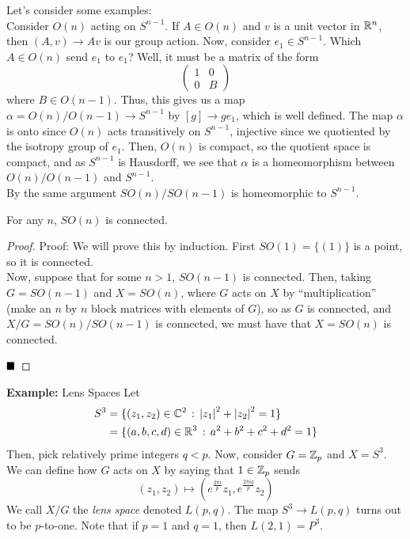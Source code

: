
Let's consider some examples:\\

Consider $O(n)$ acting on $S^{n - 1}$. If $A \in O(n)$ and $v$ is a unit vector in $\mathbb{R}^n$, then $(A, v) \to Av$ is our group action. Now, consider $e_1 \in S^{n - 1}$. Which $A \in O(n)$ send $e_1$ to $e_1$? Well, it must be a matrix of the form
\[ \begin{pmatrix} 1 & 0 \\ 0 & B \end{pmatrix} \]
where $B \in O(n  - 1)$. Thus, this gives us a map $\alpha = O(n) / O(n - 1) \to S^{n - 1}$ by $[g] \to ge_1$, which is well defined. The map $\alpha$ is onto since $O(n)$ acts transitively on $S^{n - 1}$, injective since we quotiented by the isotropy group of $e_1$. Then, $O(n)$ is compact, so the quotient space is compact, and as $S^{n - 1}$ is Hausdorff, we see that $\alpha$ is a homeomorphism between $O(n)/O(n - 1)$ and $S^{n - 1}$.\\

By the same argument $SO(n)/SO(n - 1)$ is homeomorphic to $S^{n - 1}$.

\begin{lemma}
    For any $n$, $SO(n)$ is connected.
\end{lemma}
\begin{proof}{Proof:}
    We will prove this by induction. First $SO(1) = \{(1)\}$ is a point, so it is connected.\\

    Now, suppose that for some $n > 1$, $SO(n - 1)$ is connected. Then, taking $G = SO(n - 1)$ and $X = SO(n)$, where $G$ acts on $X$ by ``multiplication'' (make an $n$ by $n$ block matrices with elements of $G$), so as $G$ is connected, and $X/G = SO(n)/SO(n - 1)$ is connected, we must have that $X = SO(n)$ is connected. 

    $\qed$
\end{proof}

\begin{example}{\textbf{Example:} Lens Spaces}
    Let
    \begin{align*}
        S^3 &= \{(z_1, z_2) \in \mathbb{C}^2 \, :\, \left\lvert {z_1} \right\rvert^2 + \left\lvert {z_2} \right\rvert^2 = 1\}\\
        &= \{(a, b, c, d) \in \mathbb{R}^3 \, :\, a^2 + b^2 + c^2 + d^2 = 1\}
    \end{align*}
    Then, pick relatively prime integers $q < p$. Now, consider $G = \mathbb{Z}_{p}$ and $X = S^{3}$. We can define how $G$ acts on $X$ by saying that $1 \in \mathbb{Z}_{p}$ sends
    \[ (z_1, z_2) \mapsto (e^{\frac{2\pi i}{p}}z_1, e^{\frac{2\pi i q}{p}}z_2) \]
    We call $X/G$ the \emph{lens space} denoted $L(p, q)$. The map $S^3 \to L(p, q)$ turns out to be $p$-to-one. Note that if $p = 1$ and $q = 1$, then $L(2, 1) = P^3$. 
\end{example}

